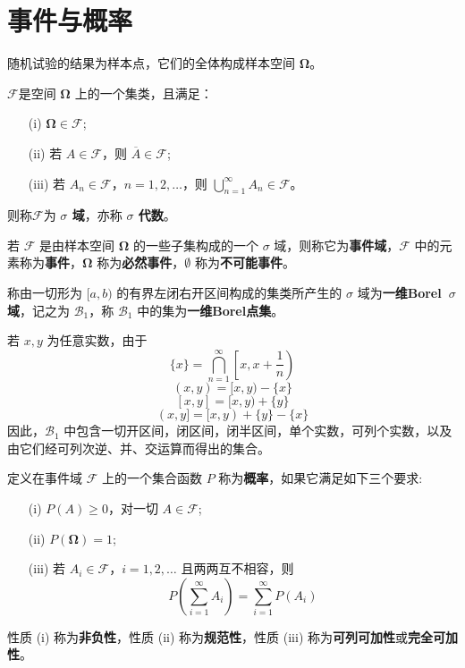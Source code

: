 \section{事件与概率}\label{sec:事件与概率}
\begin{definition}[样本空间]\label{def:样本空间}
    随机试验的结果为样本点，它们的全体构成样本空间 $\boldsymbol{\Omega}$。
\end{definition}
\begin{definition}[$\sigma$代数]\label{def:sigma代数}
    $\mathcal{F}$是空间 $\boldsymbol{\Omega}$ 上的一个集类，且满足：
\begin{enumerate}
    \item[(i)] $\boldsymbol{\Omega}\in\mathcal{F}$;
    \item[(ii)] 若 $A\in\mathcal{F}$，则 $\overline{A}\in\mathcal{F}$;
    \item[(iii)] 若 $A_n\in\mathcal{F}$，$n=1,2,\ldots$，则 $\bigcup_{n=1}^\infty A_n\in\mathcal{F}$。
\end{enumerate}
则称$\mathcal{F}$为 \textbf{$\sigma$ 域}，亦称 \textbf{$\sigma$ 代数}。
\end{definition}
\begin{definition}[事件] \label{def:event_field}
若 $\mathcal{F}$ 是由样本空间 $\boldsymbol{\Omega}$ 的一些子集构成的一个 $\sigma$ 域，则称它为\textbf{事件域}，$\mathcal{F}$ 中的元素称为\textbf{事件}，$\boldsymbol{\Omega}$ 称为\textbf{必然事件}，$\emptyset$ 称为\textbf{不可能事件}。
\end{definition}
\begin{example}\label{ex:一维Borelsigma域}
    称由一切形为 $[a,b)$ 的有界左闭右开区间构成的集类所产生的 $\sigma$ 域为\textbf{一维Borel\  $\sigma$ 域}，记之为 $\mathcal{B}_1$，称 $\mathcal{B}_1$ 中的集为\textbf{一维Borel点集}。

若 $x,y$ 为任意实数，由于
\[
\{x\} = \bigcap_{n=1}^\infty \left[x,x+\frac{1}{n}\right)
\]
\[
(x,y) = [x,y) - \{x\}
\]
\[
[x,y] = [x,y) + \{y\}
\]
\[
(x,y] = [x,y) + \{y\} - \{x\}
\]
因此，$\mathcal{B}_1$ 中包含一切开区间，闭区间，闭半区间，单个实数，可列个实数，以及由它们经可列次逆、并、交运算而得出的集合。
\end{example}

\begin{definition}[概率] \label{def:probability}
定义在事件域 $\mathcal{F}$ 上的一个集合函数 $P$ 称为\textbf{概率}，如果它满足如下三个要求:
\begin{enumerate}
    \item[(i)] $P(A) \ge 0$，对一切 $A \in \mathcal{F}$;
    \item[(ii)] $P(\boldsymbol{\Omega}) = 1$;
    \item[(iii)] 若 $A_i \in \mathcal{F}$，$i=1,2,\ldots$ 且两两互不相容，则
    \begin{equation} \label{eq:countable_additivity}
    P\left(\sum_{i=1}^\infty A_i\right) = \sum_{i=1}^\infty P(A_i)
    \end{equation}
\end{enumerate}
性质 (i) 称为\textbf{非负性}，性质 (ii) 称为\textbf{规范性}，性质 (iii) 称为\textbf{可列可加性}或\textbf{完全可加性}。
\end{definition}


